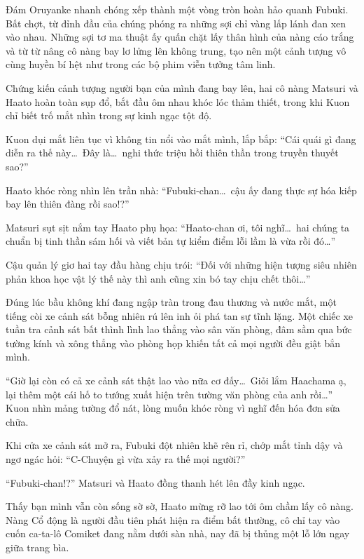 \documentclass[../main.tex]{subfiles}
\begin{document}
Đám Oruyanke nhanh chóng xếp thành một vòng tròn hoàn hảo quanh Fubuki. Bất chợt, từ đỉnh đầu của chúng phóng ra những sợi chỉ vàng lấp lánh đan xen vào nhau. Những sợi tơ ma thuật ấy quấn chặt lấy thân hình của nàng cáo trắng và từ từ nâng cô nàng bay lơ lửng lên không trung, tạo nên một cảnh tượng vô cùng huyền bí hệt như trong các bộ phim viễn tưởng tâm linh.

Chứng kiến cảnh tượng người bạn của mình đang bay lên, hai cô nàng Matsuri và Haato hoàn toàn sụp đổ, bắt đầu ôm nhau khóc lóc thảm thiết, trong khi Kuon chỉ biết trố mắt nhìn trong sự kinh ngạc tột độ.

Kuon dụi mắt liên tục vì không tin nổi vào mắt mình, lắp bắp:
``Cái quái gì đang diễn ra thế này\dots\ Đây là\dots\ nghi thức triệu hồi thiên thần trong truyền thuyết sao?''

Haato khóc ròng nhìn lên trần nhà:
``Fubuki-chan\dots\ cậu ấy đang thực sự hóa kiếp bay lên thiên đàng rồi sao!?''

Matsuri sụt sịt nắm tay Haato phụ họa:
``Haato-chan ơi, tôi nghĩ\dots\ hai chúng ta chuẩn bị tinh thần sám hối và viết bản tự kiểm điểm lỗi lầm là vừa rồi đó\dots''

Cậu quản lý giơ hai tay đầu hàng chịu trói:
``Đối với những hiện tượng siêu nhiên phản khoa học vật lý thế này thì anh cũng xin bó tay chịu chết thôi\dots''

Đúng lúc bầu không khí đang ngập tràn trong đau thương và nước mắt, một tiếng còi xe cảnh sát bỗng nhiên rú lên inh ỏi phá tan sự tĩnh lặng. Một chiếc xe tuần tra cảnh sát bất thình lình lao thẳng vào sân văn phòng, đâm sầm qua bức tường kính và xông thẳng vào phòng họp khiến tất cả mọi người đều giật bắn mình.


``Giờ lại còn có cả xe cảnh sát thật lao vào nữa cơ đấy\dots\ Giỏi lắm Haachama ạ, lại thêm một cái hố to tướng xuất hiện trên tường văn phòng của anh rồi\dots'' Kuon nhìn mảng tường đổ nát, lòng muốn khóc ròng vì nghĩ đến hóa đơn sửa chữa.

Khi cửa xe cảnh sát mở ra, Fubuki đột nhiên khẽ rên rỉ, chớp mắt tỉnh dậy và ngơ ngác hỏi:
``C-Chuyện gì vừa xảy ra thế mọi người?''

``Fubuki-chan!?'' Matsuri và Haato đồng thanh hét lên đầy kinh ngạc.

Thấy bạn mình vẫn còn sống sờ sờ, Haato mừng rỡ lao tới ôm chầm lấy cô nàng. Nàng Cổ động là người đầu tiên phát hiện ra điểm bất thường, cô chỉ tay vào cuốn ca-ta-lô Comiket đang nằm dưới sàn nhà, nay đã bị thủng một lỗ lớn ngay giữa trang bìa.
\end{document}
